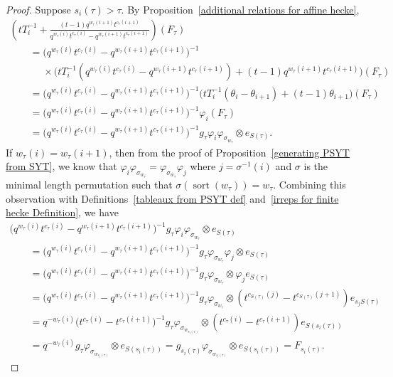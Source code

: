 \documentclass[pdftex]{sigma}
\numberwithin{equation}{section}
\theoremstyle{definition}
\DeclareMathOperator{\sort}{sort}
\begin{document}
\begin{proof}
 Suppose $s_i(\tau) > \tau$. By Proposition~\ref{additional relations for affine hecke},
 \begin{gather*}
 \left( tT_{i}^{-1} + \frac{(t-1)q^{w_{\tau}(i+1)}t^{c_{\tau}(i+1)}}{q^{w_{\tau}(i)}t^{c_{\tau}(i)}-q^{w_{\tau}(i+1)}t^{c_{\tau}(i+1)}}\right)(F_{\tau}) \\
 \qquad = \bigl( q^{w_{\tau}(i)}t^{c_{\tau}(i)}-q^{w_{\tau}(i+1)}t^{c_{\tau}(i+1)}\bigr)^{-1} \\
 \phantom{\qquad = }{} \times\bigl( tT_{i}^{-1}(q^{w_{\tau}(i)}t^{c_{\tau}(i)}-q^{w_{\tau}(i+1)}t^{c_{\tau}(i+1)}) + (t-1)q^{w_{\tau}(i+1)}t^{c_{\tau}(i+1)}\bigr)(F_{\tau}) \\
 \qquad = \bigl( q^{w_{\tau}(i)}t^{c_{\tau}(i)}-q^{w_{\tau}(i+1)}t^{c_{\tau}(i+1)}\bigr)^{-1} \bigl( tT_{i}^{-1}(\theta_{i}-\theta_{i+1}) + (t-1)\theta_{i+1}\bigr)(F_{\tau})\\
 \qquad = \bigl( q^{w_{\tau}(i)}t^{c_{\tau}(i)}-q^{w_{\tau}(i+1)}t^{c_{\tau}(i+1)}\bigr)^{-1} \varphi_i(F_{\tau}) \\
 \qquad = \bigl( q^{w_{\tau}(i)}t^{c_{\tau}(i)}-q^{w_{\tau}(i+1)}t^{c_{\tau}(i+1)}\bigr)^{-1}g_{\tau} \varphi_{i}\varphi_{\sigma_{w_{\tau}}} \otimes e_{S(\tau)}.
 \end{gather*}
 If $w_{\tau}(i) = w_{\tau}(i+1)$, then from the proof of Proposition~\ref{generating PSYT from SYT}, we know that $\varphi_i \varphi_{\sigma_{w_{\tau}}} = \varphi_{\sigma_{w_{\tau}}} \varphi_j$ where $j= \sigma^{-1}(i)$ and $\sigma$ is the minimal length permutation such that $\sigma( \sort(w_{\tau})) = w_{\tau}$. Combining this observation with Definitions~\ref{tableaux from PSYT def} and~\ref{irreps for finite hecke Definition}, we have
 \begin{gather*}
 \bigl( q^{w_{\tau}(i)}t^{c_{\tau}(i)}-q^{w_{\tau}(i+1)}t^{c_{\tau}(i+1)}\bigr)^{-1}g_{\tau} \varphi_{i}\varphi_{\sigma_{w_{\tau}}} \otimes e_{S(\tau)} \\
 \qquad =\bigl( q^{w_{\tau}(i)}t^{c_{\tau}(i)}-q^{w_{\tau}(i+1)}t^{c_{\tau}(i+1)}\bigr)^{-1}g_{\tau} \varphi_{\sigma_{w_{\tau}}}\varphi_{j} \otimes e_{S(\tau)} \\
 \qquad = \bigl( q^{w_{\tau}(i)}t^{c_{\tau}(i)}-q^{w_{\tau}(i+1)}t^{c_{\tau}(i+1)}\bigr)^{-1}g_{\tau} \varphi_{\sigma_{w_{\tau}}} \otimes \varphi_{j}e_{S(\tau)} \\
 \qquad = \bigl( q^{w_{\tau}(i)}t^{c_{\tau}(i)}-q^{w_{\tau}(i+1)}t^{c_{\tau}(i+1)}\bigr)^{-1}g_{\tau} \varphi_{\sigma_{w_{\tau}}} \otimes (t^{c_{S(\tau)}(j)}-t^{c_{S(\tau)}(j+1)}) e_{s_jS(\tau)} \\
 \qquad = q^{-w_{\tau}(i)}\bigl( t^{c_{\tau}(i)}-t^{c_{\tau}(i+1)}\bigr)^{-1}g_{\tau} \varphi_{\sigma_{w_{s_i(\tau)}}} \otimes (t^{c_{\tau}(i)}-t^{c_{\tau}(i+1)}) e_{S(s_i(\tau))} \\
 \qquad = q^{-w_{\tau}(i)}g_{\tau}\varphi_{\sigma_{w_{s_i(\tau)}}} \otimes e_{S(s_i(\tau))} = g_{s_i(\tau)}\varphi_{\sigma_{w_{s_i(\tau)}}} \otimes e_{S(s_i(\tau))} = F_{s_i(\tau)}.
 \end{gather*}


\end{proof}
\end{document}
